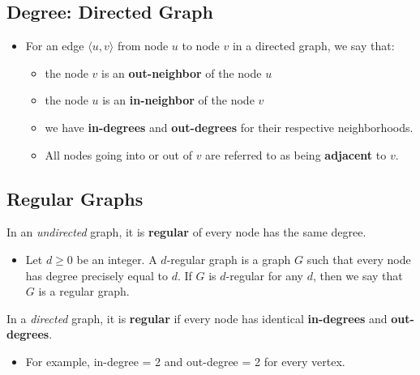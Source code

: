 \documentclass[10pt]{article}
\begin{document}
\subsection*{Degree: Directed Graph}
\begin{itemize}
	\item For an edge $\langle u, v \rangle$ from node $u$ to node $v$ in a directed graph, we say that:
    \begin{itemize}
	    \item the node $v$ is an \textbf{out-neighbor} of the node $u$
	    \item the node $u$ is an \textbf{in-neighbor} of the node $v$
	    \item we have \textbf{in-degrees} and \textbf{out-degrees} for their respective neighborhoods.
	    \item All nodes going into or out of $v$ are referred to as being \textbf{adjacent} to $v$.
    \end{itemize}
\end{itemize}

\subsection*{Regular Graphs}
In an \textit{undirected} graph, it is \textbf{regular} of every node has the same degree.
\begin{itemize}
	\item Let $d \geq 0$ be an integer.  A $d$-regular graph is a graph $G$ such that every node has degree precisely equal to $d$.  If $G$ is $d$-regular for any $d$, then we say that $G$ is a regular graph.
\end{itemize}
In a \textit{directed} graph, it is \textbf{regular} if every node has identical \textbf{in-degrees} and \textbf{out-degrees}.
\begin{itemize}
	\item For example, in-degree = 2 and out-degree = 2 for every vertex.
\end{itemize}
\end{document}
